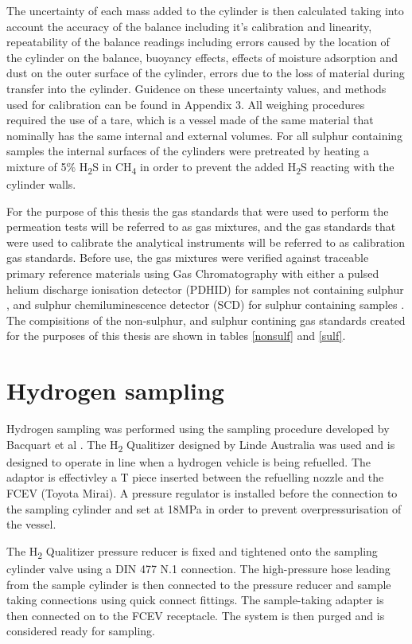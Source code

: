 The uncertainty of each mass added to the cylinder is then calculated taking into account the accuracy of the balance including it's calibration and linearity, repeatability of the balance readings including errors caused by the location of the cylinder on the balance, buoyancy effects, effects of moisture adsorption and dust on the outer surface of the cylinder, errors due to the loss of material during transfer into the cylinder. Guidence on these uncertainty values, and methods used for calibration can be found in Appendix 3. All weighing procedures required the use of a tare, which is a vessel made of the same material that nominally has the same internal and external volumes. For all sulphur containing samples the internal surfaces of the cylinders were pretreated by heating a mixture of 5\% H\textsubscript{2}S in CH\textsubscript{4} in order to prevent the added H\textsubscript{2}S reacting with the cylinder walls. 

For the purpose of this thesis the gas standards that were used to perform the permeation tests will be referred to as gas mixtures, and the gas standards that were used to calibrate the analytical instruments will be referred to as calibration gas standards. Before use, the gas mixtures were verified against traceable primary reference materials using Gas Chromatography with either a pulsed helium discharge ionisation detector (PDHID) for samples not containing sulphur \cite{bacquart_murugan_2019, morris_bacquart_2019}, and sulphur chemiluminescence detector (SCD) for sulphur containing samples \cite{bacquart_murugan_20191}. The compisitions of the non-sulphur, and sulphur contining gas standards created for the purposes of this thesis are shown in tables \ref{nonsulf} and \ref{sulf}.

\section{Hydrogen sampling}\label{sampletake}
Hydrogen sampling was performed using the sampling procedure developed by Bacquart et al \cite{BACQUART20205565}. The H\textsubscript{2} Qualitizer designed by Linde Australia was used and is designed to operate in line when a hydrogen vehicle is being refuelled. The adaptor is effectivley a T piece inserted between the refuelling nozzle and the FCEV (Toyota Mirai). A pressure regulator is installed before the connection to the sampling cylinder and set at 18MPa in order to prevent overpressurisation of the vessel. 

The H\textsubscript{2} Qualitizer pressure reducer is fixed and tightened onto the sampling cylinder valve using a DIN 477 N.1 connection. The high-pressure hose leading from the sample cylinder is then connected to the pressure reducer and sample taking connections using quick connect fittings.  The sample-taking adapter is then connected on to the FCEV receptacle. The system is then purged and is considered ready for sampling. 
 
